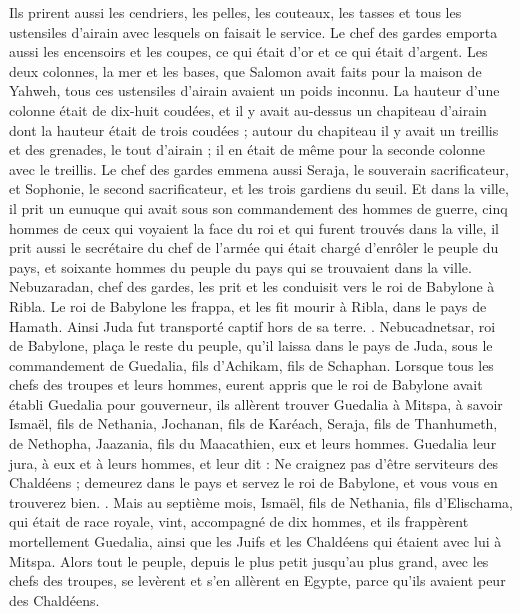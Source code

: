 \begin{multicols}{2}
Ils prirent aussi les cendriers, les pelles, les couteaux, les tasses et tous les ustensiles d'airain avec lesquels on faisait le service.
Le chef des gardes emporta aussi les encensoirs et les coupes, ce qui était d'or et ce qui était d'argent.
Les deux colonnes, la mer et les bases, que Salomon avait faits pour la maison de Yahweh, tous ces ustensiles d'airain avaient un poids inconnu.
La hauteur d'une colonne était de dix-huit coudées, et il y avait au-dessus un chapiteau d'airain dont la hauteur était de trois coudées ; autour du chapiteau il y avait un treillis et des grenades, le tout d'airain ; il en était de même pour la seconde colonne avec le treillis.
Le chef des gardes emmena aussi Seraja, le souverain sacrificateur, et Sophonie, le second sacrificateur, et les trois gardiens du seuil.
Et dans la ville, il prit un eunuque qui avait sous son commandement des hommes de guerre, cinq hommes de ceux qui voyaient la face du roi et qui furent trouvés dans la ville, il prit aussi le secrétaire du chef de l'armée qui était chargé d'enrôler le peuple du pays, et soixante hommes du peuple du pays qui se trouvaient dans la ville.
Nebuzaradan, chef des gardes, les prit et les conduisit vers le roi de Babylone à Ribla.
Le roi de Babylone les frappa, et les fit mourir à Ribla, dans le pays de Hamath. Ainsi Juda fut transporté captif hors de sa terre.
.
Nebucadnetsar, roi de Babylone, plaça le reste du peuple, qu'il laissa dans le pays de Juda, sous le commandement de Guedalia, fils d'Achikam, fils de Schaphan.
Lorsque tous les chefs des troupes et leurs hommes, eurent appris que le roi de Babylone avait établi Guedalia pour gouverneur, ils allèrent trouver Guedalia à Mitspa, à savoir Ismaël, fils de Nethania, Jochanan, fils de Karéach, Seraja, fils de Thanhumeth, de Nethopha, Jaazania, fils du Maacathien, eux et leurs hommes.
Guedalia leur jura, à eux et à leurs hommes, et leur dit : Ne craignez pas d'être serviteurs des Chaldéens ; demeurez dans le pays et servez le roi de Babylone, et vous vous en trouverez bien.
.
Mais au septième mois, Ismaël, fils de Nethania, fils d'Elischama, qui était de race royale, vint, accompagné de dix hommes, et ils frappèrent mortellement Guedalia, ainsi que les Juifs et les Chaldéens qui étaient avec lui à Mitspa.
Alors tout le peuple, depuis le plus petit jusqu'au plus grand, avec les chefs des troupes, se levèrent et s'en allèrent en Egypte, parce qu'ils avaient peur des Chaldéens.

\end{multicols}
